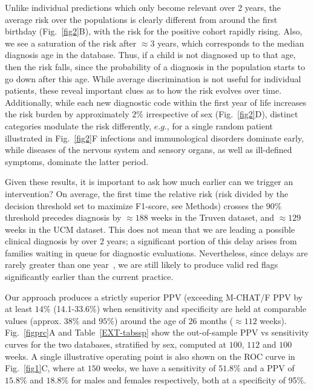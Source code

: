 \documentclass[onecolumn,,10pt]{IEEEtran}
\def\treatment{positive\xspace}
\begin{document}
Unlike individual predictions which only become relevant over 2 years, the average risk over the populations is clearly different  from around the  first birthday (Fig.~\ref{fig2}B), with the risk for the  \treatment cohort rapidly rising. Also, we see a saturation of the risk after $\approx 3$ years, which corresponds to the median diagnosis age in the database. Thus, if a child is not diagnosed up to that age, then the  risk  falls, since the probability of a diagnosis in the population starts to go down after this age. While average discrimination is not useful for individual patients, these reveal important clues as to how the  risk evolves over time. Additionally, while  each  new diagnostic code within the first year of life  increases the risk burden by approximately $2\%$ irrespective of sex (Fig.~\ref{fig2}D), distinct  categories modulate the risk differently, $e.g.$, for a single random patient  illustrated in Fig.~\ref{fig2}F infections and immunological disorders dominate early, while  diseases of the nervous system and sensory organs, as well as ill-defined symptoms,  dominate the latter period.

Given these results, it is important to ask how much earlier can we trigger an intervention? On average,  the first time the relative risk (risk divided by the decision threshold set to maximize F1-score, see Methods) crosses the $90\%$ threshold precedes  diagnosis by  $\approx 188$ weeks in the Truven dataset, and $\approx 129$ weeks in the UCM dataset. This does not mean that we are   leading a possible clinical diagnosis by over $2$ years; a significant portion of this delay arises from families waiting in queue for diagnostic evaluations. Nevertheless, since delays are rarely greater than   one year~\cite{gordon2016whittling},  we are still likely to produce valid red flags significantly earlier than the current practice.%

Our approach produces a strictly superior PPV (exceeding M-CHAT/F PPV by at  least $14\%$ (14.1-33.6\%) when sensitivity and specificity are held at comparable values (approx. $38\%$ and $95\%$) around the age of 26 months ($\approx 112$ weeks). Fig.~\ref{figprc}A and Table~\ref{EXT-tabssp} show  the out-of-sample  PPV vs sensitivity curves   for the two databases, stratified by sex, computed at $100$, $112$ and $100$ weeks. A single illustrative operating point is also shown on the ROC curve in Fig.~\ref{fig1}C, where at $150$ weeks, we have a sensitivity of $51.8\%$ and a PPV of $15.8\%$ and $18.8\%$ for males and females respectively, both at a specificity of 95\%. 
\end{document}
